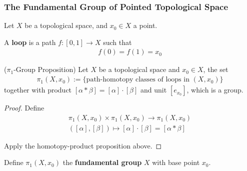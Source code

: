 \documentclass[Total.tex]{subfiles}
\begin{document}
	\subsubsection{The Fundamental Group of Pointed Topological Space}
	\begin{Def}
		Let $X$ be a topological space, and $x_0\in X$ a point.
		
		A \textbf{loop} is a path $f:[0,1]\rightarrow X$ such that
		\begin{gather*}
			f(0)=f(1)=x_0
		\end{gather*}
	\end{Def}
	\begin{proposition}
		($\pi_1$-Group Proposition) Let $X$ be a topological space and $x_0\in X$, the set
		\begin{gather*}
			\pi_1(X,x_0):=\{\mbox{path-homotopy classes of loops in }(X,x_0)\}
		\end{gather*}
		together with product $[\alpha*\beta]=[\alpha]\cdot [\beta]$ and unit $[e_{x_0}]$, which is a group.
	\end{proposition}
	\begin{proof}
		Define
		\begin{gather*}
			\pi_1(X,x_0)\times \pi_1(X,x_0)\rightarrow \pi_1(X,x_0)\\
			([\alpha],[\beta])\mapsto [\alpha]\cdot [\beta]=[\alpha*\beta]
		\end{gather*}
		
		Apply the homotopy-product proposition above.
	\end{proof}
	
	\begin{Def}
		Define $\pi_1(X,x_0)$ the \textbf{fundamental group} $X$ with base point $x_0$.
	\end{Def}
\end{document}
